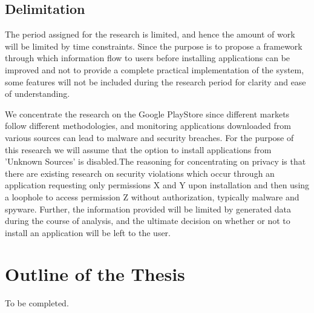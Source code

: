 \subsection{Delimitation}
The period assigned for the research is limited, and hence the amount of work will be limited by time constraints. Since the purpose is to propose a framework through which information flow to users before installing applications can be improved and not to provide a complete practical implementation of the system, some features will not be included during the research period for clarity and ease of understanding. 
\smallskip

We concentrate the research on the Google PlayStore since different markets follow different methodologies, and monitoring applications downloaded from various sources can lead to malware and security breaches. For the purpose of this research we will assume that the option to install applications from 'Unknown Sources' is disabled.The reasoning for concentrating on privacy is that there are existing research on security violations which occur through an application requesting only permissions X and Y upon installation and then using a loophole to access permission Z without authorization, typically malware and spyware. Further, the information provided will be limited by generated data during the course of analysis, and the ultimate decision on whether or not to install an application will be left to the user. 

\section{Outline of the Thesis} 
To be completed.
